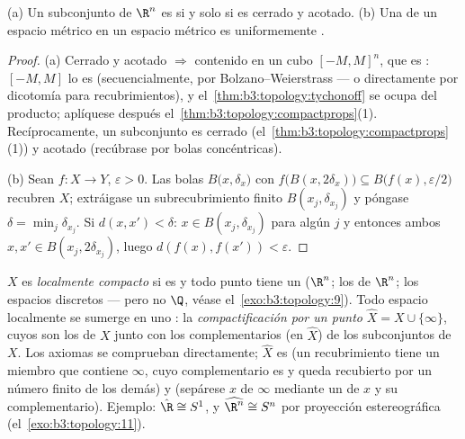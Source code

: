 \begin{corollary}
\label{cor:b3:topology:heineborel}
(a) Un subconjunto de $\R^n$ es
 si y solo si es cerrado y
acotado. (b) Una  de un espacio métrico
 en un espacio métrico es
uniformemente
.
\end{corollary}

\begin{proof}
(a) Cerrado y acotado $\Rightarrow$ contenido en un cubo $[-M,M]^n$, que
es : $[-M, M]$ lo es
(secuencialmente, por Bolzano--Weierstrass --- o directamente por
dicotomía para recubrimientos), y el~\cref{thm:b3:topology:tychonoff} se
ocupa del producto; aplíquese después
el~\cref{thm:b3:topology:compactprops}(1). Recíprocamente, un
subconjunto  es cerrado
(el~\cref{thm:b3:topology:compactprops}(1)) y acotado (recúbrase por
bolas concéntricas).

(b) Sean $f \colon X \to Y$, $\varepsilon > 0$. Las bolas
$B\bigl(x, \delta_x\bigr)$ con $f\bigl(B(x,
2\delta_x)\bigr)\subseteq B\bigl(f(x), \varepsilon/2\bigr)$ recubren
$X$; extráigase un subrecubrimiento finito $B(x_j, \delta_{x_j})$ y
póngase $\delta = \min_j \delta_{x_j}$. Si $d(x, x') < \delta$: $x
\in B(x_j, \delta_{x_j})$ para algún $j$ y entonces ambos $x, x'
\in B(x_j, 2\delta_{x_j})$, luego $d(f(x), f(x')) < \varepsilon$.
\end{proof}

\begin{definition}\label{def:b3:topology:locallycompact}
$X$ es \emph{localmente compacto} si
es  y todo punto tiene
un 
 ($\R^n$; los  de
$\R^n$; los espacios discretos --- pero no $\Q$, véase
el~\cref{exo:b3:topology:9}). Todo
espacio localmente  se sumerge
en uno : la
\emph{compactificación por un punto} $\hat X = X
\cup \{\infty\}$, cuyos  son los de $X$ junto con los
complementarios (en $\hat X$) de los subconjuntos
 de $X$. Los axiomas se
comprueban directamente; $\hat X$ es
 (un recubrimiento tiene un
miembro que contiene $\infty$, cuyo complementario es
 y queda recubierto por un
número finito de los demás) y  (sepárese $x$ de $\infty$ mediante un
 de $x$ y su complementario).
Ejemplo: $\hat\R \cong S^1$, y $\widehat{\R^n} \cong S^n$ por proyección
estereográfica (el~\cref{exo:b3:topology:11}).
\end{definition}


